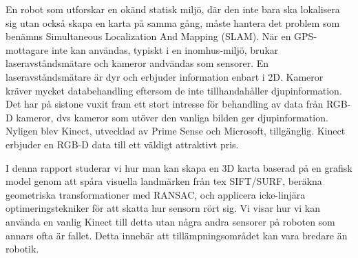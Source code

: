 En robot som utforskar en ok\"{a}nd statisk milj\"{o}, d\"{a}r den inte bara ska lokalisera sig utan ocks\r{a} skapa en karta p\r{a} samma g\r{a}ng, m\r{a}ste hantera det problem som ben\"{a}mns Simultaneous Localization And Mapping (SLAM). N\"{a}r en GPS-mottagare inte kan anv\"{a}ndas, typiskt i en inomhus-milj\"{o}, brukar laseravst\r{a}ndsm\"{a}tare och kameror andv\"{a}ndas som sensorer. En laseravst\r{a}ndsm\"{a}tare \"{a}r dyr och erbjuder information enbart i 2D. Kameror kr\"{a}ver mycket databehandling eftersom de inte tillhandah\r{a}ller djupinformation. Det har p\r{a} sistone vuxit fram ett stort intresse f\"{o}r behandling av data fr\r{a}n RGB-D kameror, dvs kameror som ut\"{o}ver den vanliga bilden ger djupinformation. Nyligen blev Kinect, utvecklad av Prime Sense och Microsoft, tillg\"{a}nglig. Kinect erbjuder en RGB-D data till ett v\"{a}ldigt attraktivt pris.

I denna rapport studerar vi hur man kan skapa en 3D karta baserad p\r{a} en grafisk model genom att sp\r{a}ra visuella landm\"{a}rken fr\r{a}n tex SIFT/SURF, ber\"{a}kna geometriska transformationer med RANSAC, och applicera icke-linj\"{a}ra optimeringstekniker f\"{o}r att skatta hur sensorn r\"{o}rt sig. Vi visar hur vi kan anv\"{a}nda en vanlig Kinect till detta utan n\r{a}gra andra sensorer p\r{a} roboten som annars ofta \"{a}r fallet. Detta inneb\"{a}r att till\"{a}mpningsomr\r{a}det kan vara bredare \"{a}n robotik.
